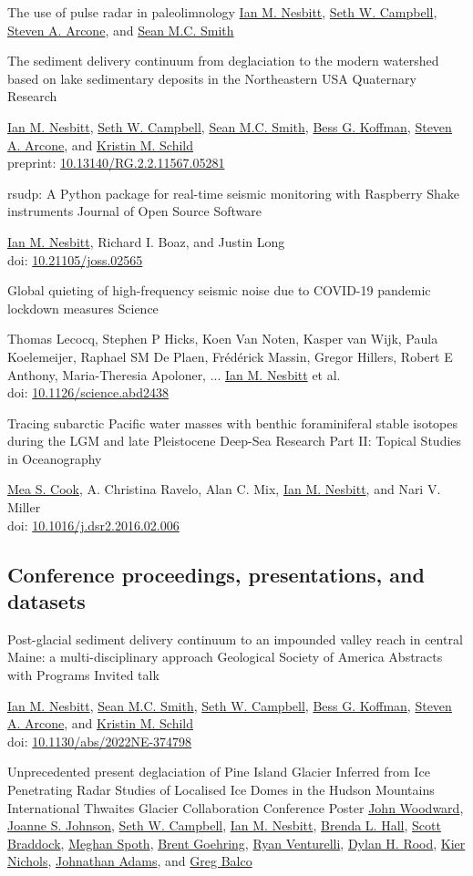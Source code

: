 \documentclass[a4paper,12pt,sans,colorlinks]{moderncv}
\newcommand{\me}{\href{https://www.iannesbitt.org}{Ian M. Nesbitt}}
\newcommand{\seth}{\href{https://www.alpinesciences.net}{Seth W. Campbell}}
\newcommand{\sean}{\href{https://umaine.edu/earthclimate/people/sean-m-c-smith/}{Sean M.C. Smith}}
\newcommand{\bess}{\href{https://www.colby.edu/directory/profile/bess.koffman/}{Bess G. Koffman}}
\newcommand{\stevearcone}{\href{https://engineering.dartmouth.edu/community/faculty/steven-arcone}{Steven A. Arcone}}
\newcommand{\kristin}{\href{https://climatechange.umaine.edu/people/kristin-schild/}{Kristin M. Schild}}
\newcommand{\richard}{Richard I. Boaz}
\newcommand{\mea}{\href{https://geosciences.williams.edu/profile/msc1/}{Mea S. Cook}}
\newcommand{\johnwoodward}{\href{https://www.northumbria.ac.uk/about-us/our-staff/w/john-woodward}{John Woodward}}
\newcommand{\joannejohnson}{\href{https://www.bas.ac.uk/profile/jsj/}{Joanne S. Johnson}}
\newcommand{\brenda}{\href{https://climatechange.umaine.edu/people/brenda-hall/}{Brenda L. Hall}}
\newcommand{\scott}{\href{https://climatechange.umaine.edu/people/scott-braddock/}{Scott Braddock}}
\newcommand{\meghan}{\href{https://climatechange.umaine.edu/people/meghan-spoth/}{Meghan Spoth}}
\newcommand{\brent}{\href{https://sse.tulane.edu/eens/faculty/goehring}{Brent Goehring}}
\newcommand{\ryanventurelli}{\href{https://sse.tulane.edu/eens/faculty/venturelli}{Ryan Venturelli}}
\newcommand{\dylanrood}{\href{http://www.imperial.ac.uk/people/d.rood}{Dylan H. Rood}}
\newcommand{\kiernichols}{\href{https://www.researchgate.net/profile/Keir-Nichols}{Kier Nichols}}
\newcommand{\johnathanadams}{\href{https://thwaitesglacier.org/people/jonathan-adams}{Johnathan Adams}}
\newcommand{\gregbalco}{\href{https://www.bgc.org/greg-balco}{Greg Balco}}
\newcommand{\doi}[1]{%
    \href{https://doi.org/#1}{#1}
}
\begin{document}
{The use of pulse radar in paleolimnology}
{}
{}
{}
{
    \me{}, \seth{}, \stevearcone{}, and \sean{}
}

{The sediment delivery continuum from deglaciation to the modern
watershed based on lake sedimentary deposits in the Northeastern
USA}
{Quaternary Research}
{}
{}
{
    \me{}, \seth{}, \sean{}, \bess{}, \stevearcone{},
    and \kristin{}
    \\
    preprint: \doi{10.13140/RG.2.2.11567.05281}
}

{rsudp: A Python package for real-time seismic
monitoring with Raspberry Shake instruments}
{Journal of Open Source Software}
{}
{}
{
    \me{}, \richard, and Justin Long
    \\
    doi: \doi{10.21105/joss.02565}
}

{Global quieting of high-frequency seismic noise
due to COVID-19 pandemic lockdown measures}
{Science}
{}
{}
{
    Thomas Lecocq, Stephen P Hicks, Koen Van Noten,
    Kasper van Wijk, Paula Koelemeijer, Raphael SM De Plaen,
    Frédérick Massin, Gregor Hillers, Robert E Anthony,
    Maria-Theresia Apoloner, ... \me{} et al.
    \\
    doi: \doi{10.1126/science.abd2438}
}

{Tracing subarctic Pacific water masses with benthic
foraminiferal stable isotopes during the LGM and late
Pleistocene}
{Deep-Sea Research Part II: Topical Studies in Oceanography}
{}
{}
{
    \mea{}, A. Christina Ravelo, Alan C. Mix, \me{},
    and Nari V. Miller
    \\
    doi: \doi{10.1016/j.dsr2.2016.02.006}
}


\newpage
\subsection{Conference proceedings, presentations, and datasets}

{Post-glacial sediment delivery continuum to an impounded
valley reach in central Maine: a multi-disciplinary approach}
{Geological Society of America Abstracts with Programs}
{}
{Invited talk}
{
    \me{}, \sean{}, \seth{}, \bess{}, \stevearcone{}, and \kristin{}
    \\
    doi: \doi{10.1130/abs/2022NE-374798}
}

{Unprecedented present deglaciation of Pine Island Glacier
Inferred from Ice Penetrating Radar Studies of Localised
Ice Domes in the Hudson Mountains}
{International Thwaites Glacier Collaboration Conference}
{}
{Poster}
{
    \johnwoodward{}, \joannejohnson{}, \seth{}, \me{}, \brenda{}, \scott{},
    \meghan{}, \brent{}, \ryanventurelli{}, \dylanrood{}, \kiernichols{},
    \johnathanadams{}, and \gregbalco{}
}
\end{document}
